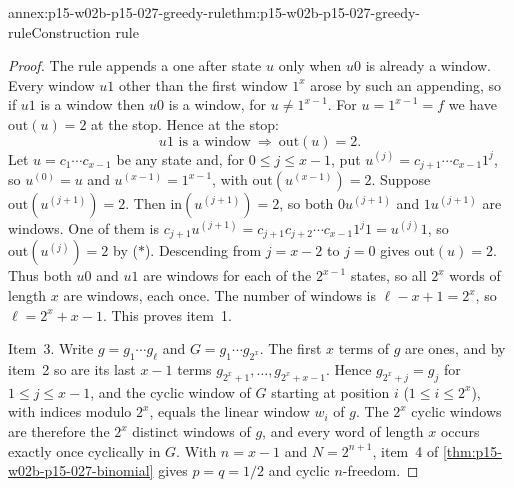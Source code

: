 \begin{annexitem}{annex:p15-w02b-p15-027-greedy-rule}{thm:p15-w02b-p15-027-greedy-rule}{Construction rule}
\begin{proof}
The rule appends a one after state \(u\) only when \(u0\) is already a
window. Every window \(u1\) other than the first window \(1^x\) arose
by such an appending, so if \(u1\) is a window then \(u0\) is a window,
for \(u\neq1^{x-1}\). For \(u=1^{x-1}=f\) we have \(\mathrm{out}(u)=2\)
at the stop. Hence at the stop:
\[
 u1\text{ is a window}\ \Longrightarrow\ \mathrm{out}(u)=2.\tag{\(*\)}
\]
Let \(u=c_1\cdots c_{x-1}\) be any state and, for \(0\leq j\leq x-1\),
put \(u^{(j)}=c_{j+1}\cdots c_{x-1}1^j\), so \(u^{(0)}=u\) and
\(u^{(x-1)}=1^{x-1}\), with \(\mathrm{out}(u^{(x-1)})=2\). Suppose
\(\mathrm{out}(u^{(j+1)})=2\). Then \(\mathrm{in}(u^{(j+1)})=2\), so both
\(0u^{(j+1)}\) and \(1u^{(j+1)}\) are windows. One of them is
\(c_{j+1}u^{(j+1)}=c_{j+1}c_{j+2}\cdots c_{x-1}1^{j}1=u^{(j)}1\), so
\(\mathrm{out}(u^{(j)})=2\) by (\(*\)). Descending from \(j=x-2\) to
\(j=0\) gives \(\mathrm{out}(u)=2\). Thus both \(u0\) and \(u1\) are
windows for each of the \(2^{x-1}\) states, so all \(2^x\) words of
length \(x\) are windows, each once. The number of windows is
\(\ell-x+1=2^x\), so \(\ell=2^x+x-1\). This proves item~1.

Item~3. Write \(g=g_1\cdots g_\ell\) and \(G=g_1\cdots g_{2^x}\). The
first \(x\) terms of \(g\) are ones, and by item~2 so are its last
\(x-1\) terms \(g_{2^x+1},\ldots,g_{2^x+x-1}\). Hence
\(g_{2^x+j}=g_j\) for \(1\leq j\leq x-1\), and the cyclic window of
\(G\) starting at position \(i\) (\(1\leq i\leq2^x\)), with indices
modulo \(2^x\), equals the linear window \(w_i\) of \(g\). The \(2^x\)
cyclic windows are therefore the \(2^x\) distinct windows of \(g\), and
every word of length \(x\) occurs exactly once cyclically in \(G\). With
\(n=x-1\) and \(N=2^{n+1}\), item~4 of
\cref{thm:p15-w02b-p15-027-binomial} gives \(p=q=1/2\) and cyclic
\(n\)-freedom.
\end{proof}
\end{annexitem}

